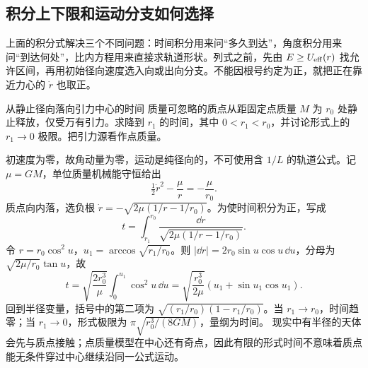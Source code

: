 \subsection{积分上下限和运动分支如何选择}
上面的积分式解决三个不同问题：时间积分用来问“多久到达”，角度积分用来问“到达何处”，比内方程用来直接求轨道形状。列式之前，先由 $E\ge U_{\rm eff}(r)$ 找允许区间，再用初始径向速度选入向或出向分支。不能因根号约定为正，就把正在靠近力心的 $\dot r$ 也取正。

\begin{origexamplebox}{从静止径向落向引力中心的时间}\label{ch11:ex:teaching-radial-fall}
质量可忽略的质点从距固定点质量 $M$ 为 $r_0$ 处静止释放，仅受万有引力。求降到 $r_1$ 的时间，其中 $0<r_1<r_0$，并讨论形式上的 $r_1\to0$ 极限。把引力源看作点质量。
\end{origexamplebox}
\begin{xesolution}
初速度为零，故角动量为零，运动是纯径向的，不可使用含 $1/L$ 的轨道公式。记 $\mu=GM$，单位质量机械能守恒给出
\[
 \tfrac12\dot r^2-\frac\mu r=-\frac\mu{r_0}.
\]
质点向内落，选负根 $\dot r=-\sqrt{2\mu(1/r-1/r_0)}$。为使时间积分为正，写成
\[
 t=\int_{r_1}^{r_0}\frac{\dd r}{\sqrt{2\mu(1/r-1/r_0)}}.
\]
令 $r=r_0\cos^2u$，$u_1=\arccos\sqrt{r_1/r_0}$。则 $|\dd r|=2r_0\sin u\cos u\,\dd u$，分母为 $\sqrt{2\mu/r_0}\tan u$，故
\[
 t=\sqrt{\frac{2r_0^3}{\mu}}\int_0^{u_1}\cos^2u\,\dd u
 =\sqrt{\frac{r_0^3}{2\mu}}\left(u_1+\sin u_1\cos u_1\right).
\]
回到半径变量，括号中的第二项为 $\sqrt{(r_1/r_0)(1-r_1/r_0)}$。当 $r_1\to r_0$，时间趋零；当 $r_1\to0$，形式极限为 $\pi\sqrt{r_0^3/(8GM)}$，量纲为时间。
现实中有半径的天体会先与质点接触；点质量模型在中心还有奇点，因此有限的形式时间不意味着质点能无条件穿过中心继续沿同一公式运动。
\end{xesolution}

